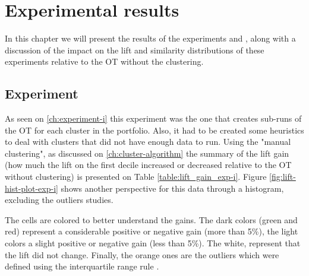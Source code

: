 \chapter{Experimental results}

In this chapter we will present the results of the experiments \nameExperimentI{} and \nameExperimentII{}, along with a discussion of the impact on the lift and similarity distributions of these experiments relative to the OT without the clustering.

\section{Experiment \fullNameExperimentI{}}

As seen on \ref{ch:experiment-i} this experiment was the one that creates sub-runs of the OT for each cluster in the portfolio. Also, it had to be created some heuristics to deal with clusters that did not have enough data to run. Using the "manual clustering", as discussed on \ref{ch:cluster-algorithm} the summary of the lift gain (how much the lift on the first decile increased or decreased relative to the OT without clustering) is presented on Table \ref{table:lift_gain_exp-i}. Figure \ref{fig:lift-hist-plot-exp-i} shows another perspective for this data through a histogram, excluding the outliers studies.

The cells are colored to better understand the gains. The dark colors (green and red) represent a considerable positive or negative gain (more than 5\%), the light colors a slight positive or negative gain (less than 5\%). The white, represent that the lift did not change. Finally, the orange ones are the outliers which were defined using the interquartile range rule \cite{upton1996understanding}. 

